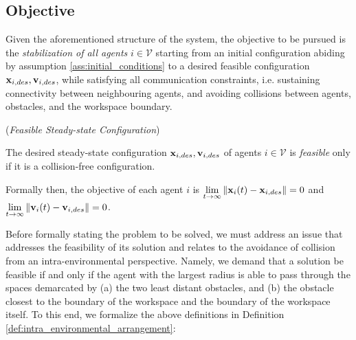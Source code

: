 \subsection{Objective}

Given the aforementioned structure of the system, the objective to be
pursued is the \textit{stabilization of all agents} $i \in \mathcal{V}$ starting
from an initial configuration abiding by assumption
\eqref{ass:initial_conditions} to a desired feasible configuration
$\bm{\mathbf{x}}_{i,des}, \bm{\mathbf{v}}_{i,des}$, while
satisfying all communication constraints, i.e. sustaining connectivity between
neighbouring agents, and avoiding collisions between agents, obstacles, and the
workspace boundary.

\begin{bw_box}
\begin{definition} (\textit{Feasible Steady-state Configuration})

The desired steady-state configuration $\bm{\mathbf{x}}_{i,des}, \bm{\mathbf{v}}_{i,des}$ of
agents $i \in \mathcal{V}$ is \textit{feasible} only if it is a collision-free
configuration.

\end{definition}
\end{bw_box}

Formally then, the objective of each agent $i$ is
$\lim\limits_{t \to \infty} \|\bm{\mathbf{x}}_i(t) - \bm{\mathbf{x}}_{i,des}\| = 0$ and
$\lim\limits_{t \to \infty} \|\bm{\mathbf{v}}_i(t) - \bm{\mathbf{v}}_{i,des}\| = 0$.

Before formally stating the problem to be solved, we must address an issue
that addresses the feasibility of its solution and relates to the avoidance of
collision from an intra-environmental perspective. Namely, we demand that a
solution be feasible if and only if the agent with the largest radius is able to
pass through the spaces demarcated by (a) the two least distant obstacles,
and (b) the obstacle closest to the boundary of the workspace and the
boundary of the workspace itself. To this end, we formalize the above
definitions in Definition \eqref{def:intra_environmental_arrangement}:

